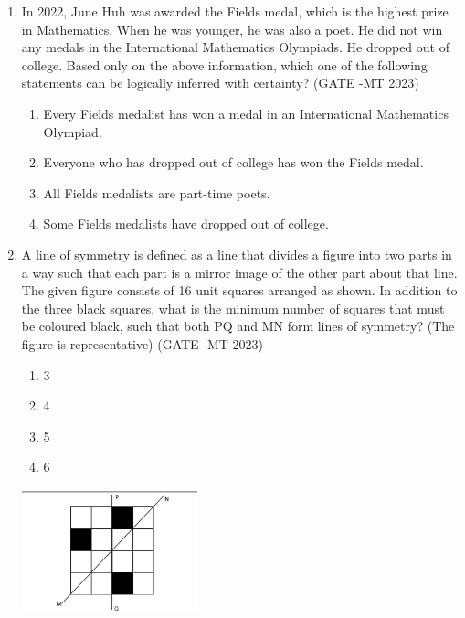 \documentclass[12pt]{article}
\begin{document}
\begin{enumerate}
\item In 2022, June Huh was awarded the Fields medal, which is the highest prize in Mathematics.
When he was younger, he was also a poet. He did not win any medals in the International Mathematics Olympiads. He dropped out of college.
Based only on the above information, which one of the following statements can be logically inferred with certainty? (GATE -MT 2023)
\begin{enumerate}[label=(\alph*)]
  \item Every Fields medalist has won a medal in an International Mathematics Olympiad.
  \item Everyone who has dropped out of college has won the Fields medal.
  \item All Fields medalists are part-time poets.
  \item Some Fields medalists have dropped out of college.
\end{enumerate}

\item A line of symmetry is defined as a line that divides a figure into two parts in a way such that each part is a mirror image of the other part about that line.
The given figure consists of 16 unit squares arranged as shown. In addition to the three black squares, what is the minimum number of squares that must be coloured black, such that both PQ and MN form lines of symmetry? (The figure is representative) (GATE -MT 2023)
\begin{enumerate}[label=(\alph*)]
  \item 3
  \item 4
  \item 5
  \item 6
\end{enumerate}


\begin{center}
\includegraphics[width=0.4\textwidth]{images/qqq5i.jpg}
\end{center}


\end{enumerate}
\end{document}
